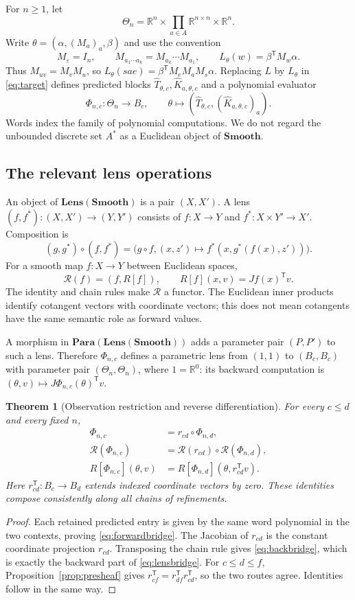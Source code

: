 \documentclass[11pt]{article}
\newtheorem{theorem}{Theorem}[section]
\theoremstyle{definition}
\newcommand{\R}{\mathbb R}
\newcommand{\Smooth}{\mathbf{Smooth}}
\newcommand{\Lens}{\mathbf{Lens}}
\newcommand{\Para}{\mathbf{Para}}
\newcommand{\rev}{\mathcal R}
\begin{document}
For $n\geq1$, let
\[
\Theta_n=\R^n\times\prod_{a\in A}\R^{n\times n}\times\R^n.
\]
Write $\theta=(\alpha,(M_a)_a,\beta)$ and use the convention
\[
M_\varepsilon=I_n,\qquad
M_{a_1\cdots a_k}=M_{a_k}\cdots M_{a_1},\qquad
L_\theta(w)=\beta^{\mathsf T}M_w\alpha.
\]
Thus $M_{uv}=M_vM_u$, so $L_\theta(sae)=\beta^{\mathsf T}M_eM_aM_s\alpha$.
Replacing $L$ by $L_\theta$ in \eqref{eq:target} defines predicted blocks
$\widehat T_{\theta,c},\widehat K_{a,\theta,c}$ and a polynomial evaluator
\[
\Phi_{n,c}:\Theta_n\longrightarrow B_c,
\qquad
\theta\longmapsto
(\widehat T_{\theta,c},(\widehat K_{a,\theta,c})_a).
\]
Words index the family of polynomial computations. We do not regard the
unbounded discrete set $A^*$ as a Euclidean object of $\Smooth$.

\subsection{The relevant lens operations}

An object of $\Lens(\Smooth)$ is a pair $(X,X')$. A lens
$(f,f^*):(X,X')\to(Y,Y')$ consists of
$f:X\to Y$ and $f^*:X\times Y'\to X'$. Composition is
\[
(g,g^*)\circ(f,f^*)
=\bigl(g\circ f,(x,z')\mapsto f^*(x,g^*(f(x),z'))\bigr).
\]
For a smooth map $f:X\to Y$ between Euclidean spaces,
\[
\rev(f)=(f,R[f]),\qquad R[f](x,v)=Jf(x)^{\mathsf T}v.
\]
The identity and chain rules make $\rev$ a functor. The Euclidean inner products
identify cotangent vectors with coordinate vectors; this does not mean
cotangents have the same semantic role as forward values.

A morphism in $\Para(\Lens(\Smooth))$ adds a parameter pair $(P,P')$ to such
a lens. Therefore $\Phi_{n,c}$ defines a parametric lens from $(1,1)$ to
$(B_c,B_c)$ with parameter pair $(\Theta_n,\Theta_n)$, where $1=\R^0$:
its backward computation is $(\theta,v)\mapsto J\Phi_{n,c}(\theta)^{\mathsf T}v$.

\begin{theorem}[Observation restriction and reverse differentiation]\label{thm:bridge}
For every $c\leq d$ and every fixed $n$,
\begin{align}
\Phi_{n,c}&=r_{cd}\circ\Phi_{n,d},\label{eq:forwardbridge}\\
\rev(\Phi_{n,c})&=\rev(r_{cd})\circ\rev(\Phi_{n,d}),\label{eq:lensbridge}\\
R[\Phi_{n,c}](\theta,v)
&=R[\Phi_{n,d}](\theta,r_{cd}^{\mathsf T}v).\label{eq:backbridge}
\end{align}
Here $r_{cd}^{\mathsf T}:B_c\to B_d$ extends indexed coordinate vectors by
zero. These identities compose consistently along all chains of refinements.
\end{theorem}
\begin{proof}
Each retained predicted entry is given by the same word polynomial in the two
contexts, proving \eqref{eq:forwardbridge}. The Jacobian of $r_{cd}$ is the
constant coordinate projection $r_{cd}$. Transposing the chain rule gives
\eqref{eq:backbridge}, which is exactly the backward part of
\eqref{eq:lensbridge}. For $c\leq d\leq f$, Proposition~\ref{prop:presheaf}
gives $r_{cf}^{\mathsf T}=r_{df}^{\mathsf T}r_{cd}^{\mathsf T}$, so the two
routes agree. Identities follow in the same way.
\end{proof}
\end{document}
